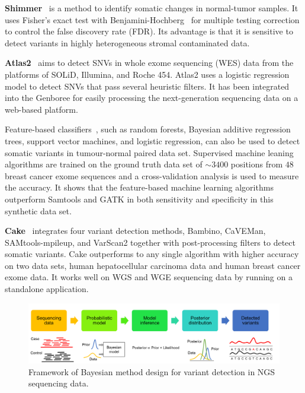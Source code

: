 \documentclass[a4,center,fleqn]{NAR}
\begin{document}
\textbf{Shimmer}~\citep{Hansen2013} is a method to identify somatic changes in normal-tumor samples.
It uses Fisher's exact test with Benjamini-Hochberg~\citep{benjamini1995controlling} for multiple testing correction to control the false discovery rate (FDR).
Its advantage is that it is sensitive to detect variants in highly heterogeneous stromal contaminated data.

\textbf{Atlas2}~\citep{challis2012integrative} aims to detect SNVs in whole exome sequencing (WES) data from the platforms of SOLiD, Illumina, and Roche 454.
Atlas2 uses a logistic regression model to detect SNVs that pass several heuristic filters.
It has been integrated into the Genboree for easily processing the next-generation sequencing data on a web-based platform.

Feature-based classifiers~\citep{Ding2012}, such as random forests, Bayesian additive regression trees, support vector machines, and logistic regression, can also be used to detect somatic variants in tumour-normal paired data set.
Supervised machine leaning algorithms are trained on the ground truth data set of $\sim 3400$ positions from $48$ breast cancer exome sequences and a cross-validation analysis is used to measure the accuracy.
It shows that the feature-based machine learning algorithms outperform Samtools and GATK in both sensitivity and specificity in this synthetic data set.

\textbf{Cake}~\citep{rashid2013cake} integrates four variant detection methods, Bambino, CaVEMan, SAMtools-mpileup, and VarScan2 together with post-processing filters to detect somatic variants.
Cake outperforms to any single algorithm with higher accuracy on two data sets, human hepatocellular carcinoma data and human breast cancer exome data.
It works well on WGS and WGE sequencing data by running on a standalone application.


\begin{figure}[htbp]
\centering
\includegraphics[width=1\textwidth]{bayesian.png}
\caption{Framework of Bayesian method design for variant detection in NGS sequencing data.}
\label{fig:Bayesian}
\end{figure}
\end{document}
